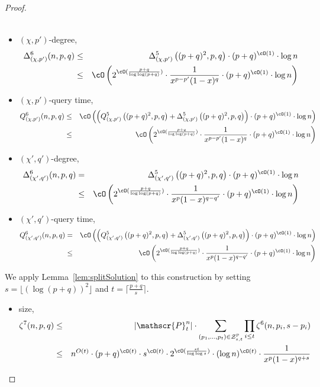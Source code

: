 \begin{proof}
\begin{itemize}
\begin{eqnarray*}
\end{eqnarray*}
\item $(\chi,p')$-degree, 
\begin{eqnarray*}
\Delta_{(\chi,p')}^6(n,p,q) &\leq& \Delta_{(\chi,p')}^5\left((p+q)^2,p,q\right) \cdot  (p+q)^{\cO(1)} \cdot \log n \\
&\leq& \cO\left( 2^{\cO(\frac{p+q}{\log\log(p+q)})} \cdot \frac{1}{x^{p-p'}(1-x)^q} \cdot (p+q)^{\cO(1)} \cdot \log n\right)
\end{eqnarray*}
\item $(\chi,p')$-query time,
\begin{eqnarray*}
Q_{(\chi,p')}^6(n,p,q) &\leq& \cO\left(\left(Q_{(\chi,p')}^5\left((p+q)^2,p,q\right) + \Delta_{(\chi,p')}^5\left((p+q)^2,p,q\right) \right) \cdot (p+q)^{\cO(1)} \cdot \log n\right)\\
&\leq& \cO\left( 2^{\cO(\frac{p+q}{\log\log(p+q)})} \cdot \frac{1}{x^{p-p'}(1-x)^q} \cdot (p+q)^{\cO(1)} \cdot \log n\right)
\end{eqnarray*}
\item $(\chi',q')$-degree, 
\begin{eqnarray*}
\Delta_{(\chi',q')}^6(n,p,q)&=&\Delta_{(\chi',q')}^5\left((p+q)^2,p,q\right) \cdot  (p+q)^{\cO(1)} \cdot \log n\\
&\leq& \cO\left( 2^{\cO(\frac{p+q}{\log\log(p+q)})} \cdot \frac{1}{x^{p}(1-x)^{q-q'}} \cdot (p+q)^{\cO(1)} \cdot \log n\right)
\end{eqnarray*}
\item $(\chi',q')$-query time, 
\begin{eqnarray*}
Q_{(\chi',q')}^6(n,p,q)&=&\cO\left(\left(Q_{(\chi',q')}^5\left((p+q)^2,p,q\right) + \Delta_{(\chi',q')}^5\left((p+q)^2,p,q\right) \right) \cdot (p+q)^{\cO(1)} \cdot \log n\right)\\
&\leq& \cO\left( 2^{\cO(\frac{p+q}{\log\log(p+q)})} \cdot \frac{1}{x^{p}(1-x)^{q-q'}} \cdot (p+q)^{\cO(1)} \cdot \log n\right)
\end{eqnarray*}
\end{itemize}
We apply Lemma~\ref{lem:splitSolution} to this construction by setting $s=\lfloor(\log (p+q))^2 \rfloor$ and 
$t = \lceil \frac{p+q}{s} \rceil$.
\begin{itemize}\item size,
\begin{eqnarray*}
\zeta^7(n,p,q) &\leq& |\mathscr{P}_t^n| \cdot 
\sum_{(p_1,\ldots,p_t) \in {\cal Z}_{s,t}^{p} } \prod_{i \leq t} \zeta^6(n,p_i,s-p_i)\\
&\leq& n^{O(t)}\cdot(p+q)^{\cO(t)}\cdot s^{\cO(t)} \cdot 2^{\cO(\frac{st}{\log\log s})}\cdot (\log n)^{\cO(t)}\cdot \frac{1}{x^p(1-x)^{q+s}}\\ 

\end{eqnarray*}
\end{itemize}
\end{proof}
